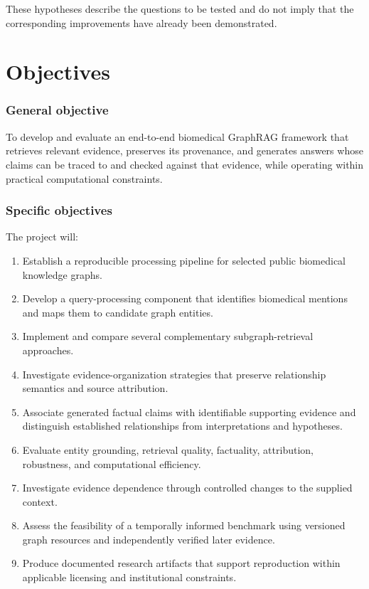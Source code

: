 These hypotheses describe the questions to be tested and do not imply that the corresponding improvements have already been demonstrated.

\section{Objectives}\label{objectives}

\subsubsection{General objective}\label{general-objective}

To develop and evaluate an end-to-end biomedical GraphRAG framework that retrieves relevant evidence, preserves its provenance, and generates answers whose claims can be traced to and checked against that evidence, while operating within practical computational constraints.

\subsubsection{Specific objectives}\label{specific-objectives}

The project will:

\begin{enumerate}
\def\labelenumi{\arabic{enumi}.}
\tightlist
\item
  Establish a reproducible processing pipeline for selected public biomedical knowledge graphs.
\item
  Develop a query-processing component that identifies biomedical mentions and maps them to candidate graph entities.
\item
  Implement and compare several complementary subgraph-retrieval approaches.
\item
  Investigate evidence-organization strategies that preserve relationship semantics and source attribution.
\item
  Associate generated factual claims with identifiable supporting evidence and distinguish established relationships from interpretations and hypotheses.
\item
  Evaluate entity grounding, retrieval quality, factuality, attribution, robustness, and computational efficiency.
\item
  Investigate evidence dependence through controlled changes to the supplied context.
\item
  Assess the feasibility of a temporally informed benchmark using versioned graph resources and independently verified later evidence.
\item
  Produce documented research artifacts that support reproduction within applicable licensing and institutional constraints.
\end{enumerate}

